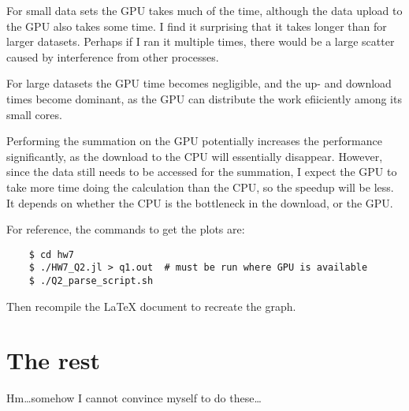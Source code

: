 \documentclass[11pt]{article}
\begin{document}
For small data sets the GPU takes much of the time, although the data upload to
the GPU also takes some time. I find it surprising that it takes longer than
for larger datasets. Perhaps if I ran it multiple times, there would be a large
scatter caused by interference from other processes.

For large datasets the GPU time becomes negligible, and the up- and download
times become dominant, as the GPU can distribute the work efiiciently among its
small cores.

Performing the summation on the GPU potentially increases the performance
significantly, as the download to the CPU will essentially disappear. However,
since the data still needs to be accessed for the summation, I expect the GPU
to take more time doing the calculation than the CPU, so the speedup will be
less. It depends on whether the CPU is the bottleneck in the download, or the
GPU.

For reference, the commands to get the plots are:
\begin{center}
\begin{verbatim}
    $ cd hw7
    $ ./HW7_Q2.jl > q1.out  # must be run where GPU is available
    $ ./Q2_parse_script.sh
\end{verbatim}
\end{center}
Then recompile the \LaTeX{} document  to recreate the graph.



\section{The rest}

Hm\ldots somehow I cannot convince myself to do these\ldots
\end{document}

